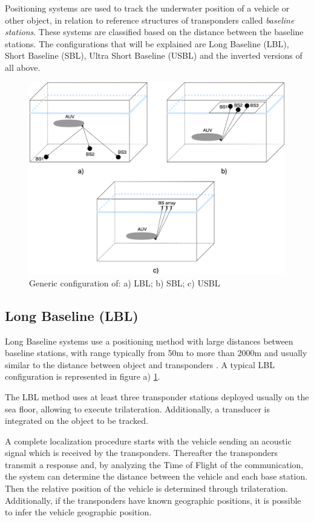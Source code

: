 Positioning systems are used to track the underwater position of a vehicle or other object, in relation to reference structures of transponders called \textit{baseline stations}. These systems are classified based on the distance between the baseline stations. The configurations that will be explained are Long Baseline (LBL), Short Baseline (SBL), Ultra Short Baseline (USBL) and the inverted versions of all above.

\begin{figure}[!htbp]
	\centering
	\includegraphics[width=1\textwidth]{figures/lblsblusbl}
	\caption{Generic configuration of: a) LBL; b) SBL; c) USBL}
	\label{fig:lblsblusbl}
\end{figure}

\subsection{Long Baseline (LBL)}

Long Baseline systems use a positioning method with large distances between baseline stations, with range typically from 50m to more than 2000m  and usually similar to the distance between object and transponders \cite{crosscorr}. A typical LBL configuration is represented in figure a) \ref{fig:lblsblusbl}.

The LBL method uses at least three transponder stations deployed usually on the sea floor, allowing to execute trilateration. Additionally, a transducer is integrated on the object to be tracked. 

A complete localization procedure starts with the vehicle sending an acoustic signal which is received by the transponders. Thereafter the transponders transmit a response and, by analyzing the Time of Flight of the communication, the system can determine the distance between the vehicle and each base station. Then the relative position of the vehicle is determined through trilateration. Additionally, if the transponders have known geographic positions, it is possible to infer the vehicle geographic position. 

